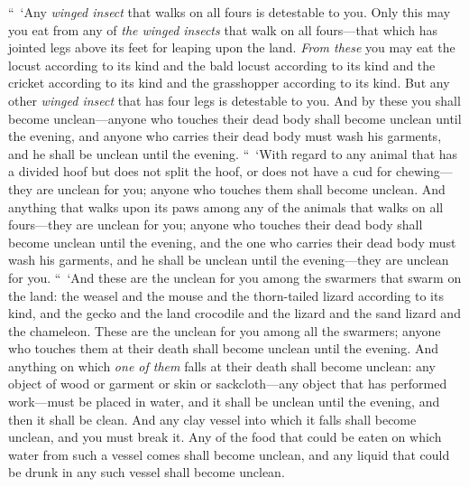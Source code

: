 \begin{biblechapter}
\verse “ ‘Any \textit{winged insect} that walks on all fours is detestable to you.
\verse Only this may you eat from any of \textit{the winged insects} that walk on all fours—that which has jointed legs above its feet for leaping upon the land.
\verse \textit{From these} you may eat the locust according to its kind and the bald locust according to its kind and the cricket according to its kind and the grasshopper according to its kind.
\verse But any other \textit{winged insect} that has four legs is detestable to you.
\verse And by these you shall become unclean—anyone who touches their dead body shall become unclean until the evening,
\verse and anyone who carries their dead body must wash his garments, and he shall be unclean until the evening.
\verse “ ‘With regard to any animal that has a divided hoof but does not split the hoof, or does not have a cud for chewing—they are unclean for you; anyone who touches them shall become unclean.
\verse And anything that walks upon its paws among any of the animals that walks on all fours—they are unclean for you; anyone who touches their dead body shall become unclean until the evening,
\verse and the one who carries their dead body must wash his garments, and he shall be unclean until the evening—they are unclean for you.
\verse “ ‘And these are the unclean for you among the swarmers that swarm on the land: the weasel and the mouse and the thorn-tailed lizard according to its kind,
\verse and the gecko and the land crocodile and the lizard and the sand lizard and the chameleon.
\verse These are the unclean for you among all the swarmers; anyone who touches them at their death shall become unclean until the evening.
\verse And anything on which \textit{one of them} falls at their death shall become unclean: any object of wood or garment or skin or sackcloth—any object that has performed work—must be placed in water, and it shall be unclean until the evening, and then it shall be clean.
\verse And any clay vessel into which it falls shall become unclean, and you must break it.
\verse Any of the food that could be eaten on which water from such a vessel comes shall become unclean, and any liquid that could be drunk in any such vessel shall become unclean.

\end{biblechapter}
